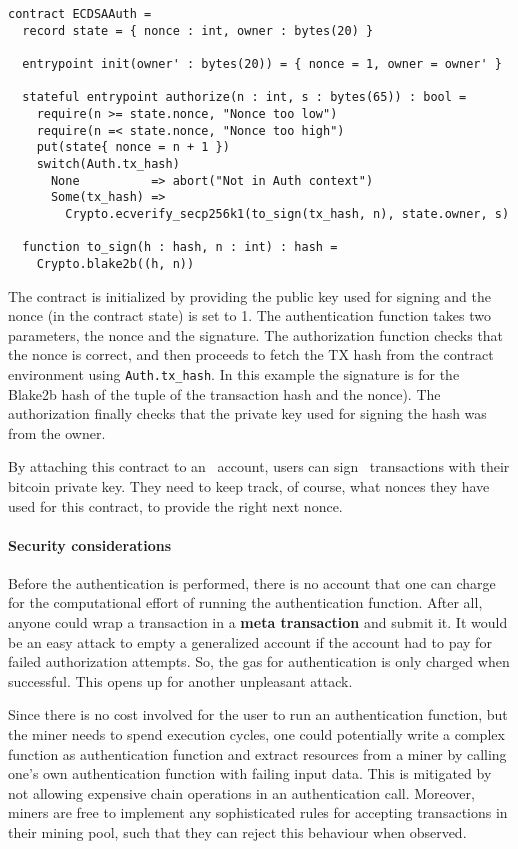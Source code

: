 \begin{verbatim}
contract ECDSAAuth =
  record state = { nonce : int, owner : bytes(20) }

  entrypoint init(owner' : bytes(20)) = { nonce = 1, owner = owner' }

  stateful entrypoint authorize(n : int, s : bytes(65)) : bool =
    require(n >= state.nonce, "Nonce too low")
    require(n =< state.nonce, "Nonce too high")
    put(state{ nonce = n + 1 })
    switch(Auth.tx_hash)
      None          => abort("Not in Auth context")
      Some(tx_hash) =>
        Crypto.ecverify_secp256k1(to_sign(tx_hash, n), state.owner, s)

  function to_sign(h : hash, n : int) : hash =
    Crypto.blake2b((h, n))

\end{verbatim}

The contract is initialized by providing the public key used for
signing and the nonce (in the contract state) is set to 1. The
authentication function takes two parameters, the nonce and the signature.
The authorization function checks that the nonce is correct, and then
proceeds to fetch the TX hash from the contract environment using
\verb+Auth.tx_hash+. In this example the signature is for the Blake2b
hash of the tuple of the transaction hash and the nonce). The
authorization finally checks that the private key used for signing the
hash was from the owner.


By attaching this contract to an \aet\ account, users can sign
\aet\ transactions with their bitcoin private key. They need to
keep track, of course, what nonces they have used for this contract,
to provide the right next nonce.

\paragraph{Security considerations}

Before the authentication is performed, there is no account that one
can charge for the computational effort of running the authentication
function. After all, anyone could wrap a transaction in a \textbf{meta
  transaction} and submit it. It would be an easy attack to empty a
generalized account if the account had to pay for failed authorization
attempts. So, the gas for authentication is only charged when
successful. This opens up for another unpleasant attack.

Since there is no cost involved for the user to run an authentication
function, but the miner needs to spend execution cycles, one could
potentially write a complex function as authentication function and
extract resources from a miner by calling one's own authentication
function with failing input data. This is mitigated by not allowing
expensive chain operations in an authentication call. Moreover, miners
are free to implement any sophisticated rules for accepting
transactions in their mining pool, such that they can reject this
behaviour when observed.

